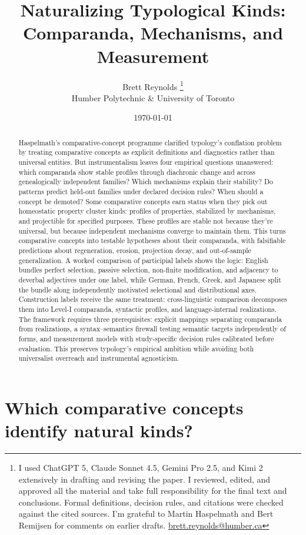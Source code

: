 \documentclass[12pt]{article}
\title{Naturalizing Typological Kinds:\\Comparanda, Mechanisms, and Measurement}
\author{Brett Reynolds \orcidlink{0000-0003-0073-7195}\thanks{I used ChatGPT 5, Claude Sonnet 4.5, Gemini Pro 2.5, and Kimi 2 extensively in drafting and revising the paper. I reviewed, edited, and approved all the material and take full responsibility for the final text and conclusions. Formal definitions, decision rules, and citations were checked against the cited sources. I'm grateful to Martin Haspelmath and Bert Remijsen for comments on earlier drafts.
 \href{mailto:brett.reynolds@humber.ca}{brett.reynolds@humber.ca}}\\Humber Polytechnic \& University of Toronto}
\date{\today}
\begin{document}
\maketitle


\begin{abstract}
Haspelmath's comparative-concept programme clarified typology's conflation problem by treating comparative concepts as explicit definitions and diagnostics rather than universal entities. But instrumentalism leaves four empirical questions unanswered: which comparanda show stable profiles through diachronic change and across genealogically independent families? Which mechanisms explain their stability? Do patterns predict held-out families under declared decision rules? When should a concept be demoted? Some comparative concepts earn  status when they pick out homeostatic property cluster kinds: profiles of properties, stabilized by mechanisms, and projectible for specified purposes. These profiles are stable not because they're universal, but because independent mechanisms converge to maintain them. This turns comparative concepts into testable hypotheses about their comparanda, with falsifiable predictions about regeneration, erosion, projection decay, and out-of-sample generalization. A worked comparison of participial labels shows the logic: English bundles perfect selection, passive selection, non-finite modification, and adjacency to deverbal adjectives under one label, while German, French, Greek, and Japanese split the bundle along independently motivated selectional and distributional axes. Construction labels receive the same treatment: cross-linguistic comparison decomposes them into Level-I comparanda, syntactic profiles, and language-internal realizations. The framework requires three prerequisites: explicit mappings separating comparanda from realizations, a syntax--semantics firewall testing semantic targets independently of forms, and measurement models with study-specific decision rules calibrated before evaluation. This preserves typology's empirical ambition while avoiding both universalist overreach and instrumental agnosticism.
\end{abstract}

\newpage

\section{Which comparative concepts identify natural kinds?}\label{sec:naturalization-question}
\end{document}
